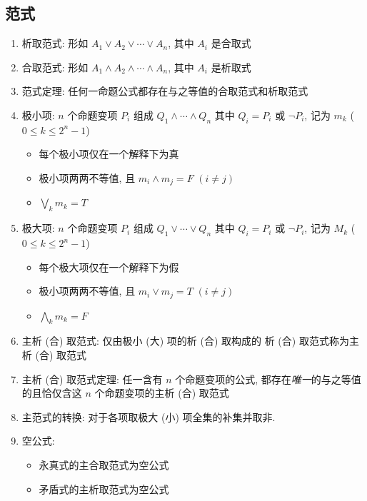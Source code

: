 \documentclass[11pt,a4paper,twocolumn,fleqn]{article} %
\begin{document}
\subsection{范式} %
\label{sub:normal_form}
\begin{enumerate}
	\item 析取范式: 形如 $A_1\lor A_2 \lor \cdots \lor A_n$, 其中 $A_i$ 是合取式
	\item 合取范式: 形如 $A_1\land A_2 \land \cdots \land A_n$, 其中 $A_i$ 是析取式
	\item 范式定理: 任何一命题公式都存在与之等值的合取范式和析取范式
	\item 极小项: $n$ 个命题变项 $P_i$ 组成 $Q_1\land \cdots \land Q_n$ 其中
	$Q_i = P_i$ 或 $\lnot P_i$, 记为 $m_k$ ($0\le k \le 2^n - 1$)
	\begin{itemize}
		\item 每个极小项仅在一个解释下为真
		\item 极小项两两不等值, 且 $m_i\land m_j = F$ $(i\neq j)$
		\item $\bigvee_k m_k = T$
	\end{itemize}
	\item 极大项: $n$ 个命题变项 $P_i$ 组成 $Q_1\lor \cdots \lor Q_n$ 其中
	$Q_i = P_i$ 或 $\lnot P_i$, 记为 $M_k$ ($0\le k \le 2^n - 1$)
	\begin{itemize}
		\item 每个极大项仅在一个解释下为假
		\item 极小项两两不等值, 且 $m_i\lor m_j = T$ $(i\neq j)$
		\item $\bigwedge_k m_k = F$
	\end{itemize}
	\item 主析 (合) 取范式: 仅由极小 (大) 项的析 (合) 取构成的
	析 (合) 取范式称为主析 (合) 取范式
	\item 主析 (合) 取范式定理: 任一含有 $n$ 个命题变项的公式, 
	都存在\emph{唯一}的与之等值的且恰仅含这 $n$ 个命题变项的主析 (合) 取范式
	\item 主范式的转换: 对于各项取极大 (小) 项全集的补集并取非.
	\item 空公式: 
	\begin{itemize}
		\item 永真式的主合取范式为空公式
		\item 矛盾式的主析取范式为空公式
	\end{itemize}
\end{enumerate}
\end{document}
